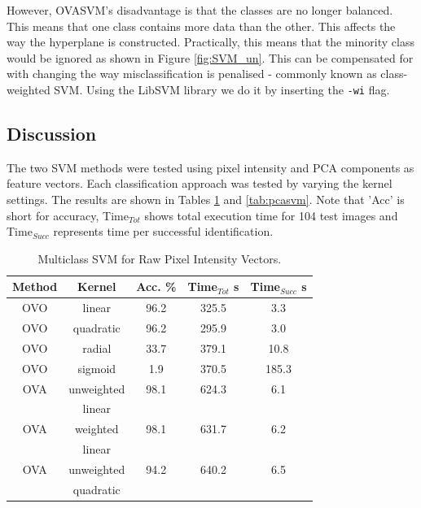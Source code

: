 \documentclass[10pt,twocolumn,letterpaper]{article}
\begin{document}
However, OVASVM's disadvantage is that the classes are no longer balanced. This means that one class contains more data than the other. This affects the way the hyperplane is constructed. Practically, this means that the minority class would be ignored as shown in Figure \ref{fig:SVM_un}. This can be compensated for with changing the way misclassification is penalised - commonly known as class-weighted SVM. Using the LibSVM library we do it by inserting the {\tt\small -wi} flag.

\subsection{Discussion}

The two SVM methods were tested using pixel intensity and PCA components as feature vectors. Each classification approach was tested by varying the kernel settings. The results are shown in Tables \ref{tab:rawsvm} and \ref{tab:pcasvm}. Note that 'Acc' is short for accuracy, Time$_{Tot}$ shows total execution time for 104 test images and Time$_{Succ}$ represents time per successful identification.

\begin{table}[H]
\begin{center}
\caption{Multiclass SVM for Raw Pixel Intensity Vectors.} \label{tab:rawsvm}
\small
\begin{tabular}{||c c c c c||}
\hline
\bf Method & \bf Kernel & \bf Acc. \% & \bf Time$_{Tot}$ s & \bf Time$_{Succ}$ s\\ [0.5ex]
\hline \hline
OVO & linear & 96.2 & 325.5 & 3.3\\ [0.5ex]
\hline
OVO & quadratic & 96.2 & 295.9 & 3.0\\ [0.5ex]
\hline
OVO & radial & 33.7 & 379.1 & 10.8\\ [0.5ex]
\hline
OVO & sigmoid & 1.9 & 370.5 & 185.3\\ [0.5ex]
\hline \hline
OVA & unweighted & 98.1 & 624.3 & 6.1\\ [0.5ex]
& linear & & &\\ [0.5ex]
\hline
OVA & weighted & 98.1 & 631.7 & 6.2\\ [0.5ex]
 & linear & & & \\ [0.5ex]
\hline
OVA & unweighted & 94.2 & 640.2 & 6.5\\ [0.5ex]
 & quadratic & & &\\ [0.5ex]
\hline
\end{tabular}
\end{center}
\end{table}
\end{document}
